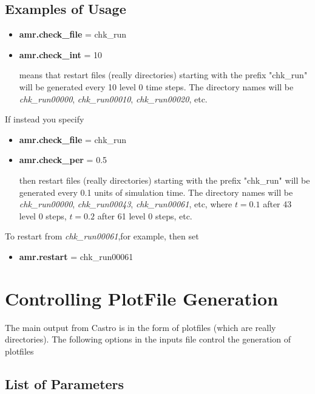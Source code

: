 \subsection{Examples of Usage}

\begin{itemize}

\item {\bf amr.check\_file} = chk\_run
\item {\bf amr.check\_int} = 10

means that restart files (really directories) starting with the prefix "chk\_run" will be
generated every 10 level 0 time steps.  The directory names will be {\it chk\_run00000}, 
{\it chk\_run00010}, {\it chk\_run00020}, etc.

\end{itemize}

If instead you specify

\begin{itemize}

\item {\bf amr.check\_file} = chk\_run
\item {\bf amr.check\_per} = 0.5

then restart files (really directories) starting with the prefix "chk\_run" will be
generated every 0.1 units of simulation time.  The directory names will be {\it chk\_run00000}, 
{\it chk\_run00043}, {\it chk\_run00061}, etc, where $t = 0.1$ after 43 level 0 steps, 
$t = 0.2$ after 61 level 0 steps, etc.

\end{itemize}

To restart from {\it chk\_run00061},for example, then set 

\begin{itemize}
\item {\bf amr.restart} = chk\_run00061
\end{itemize}

\section{Controlling PlotFile Generation}
\label{sec:PlotFiles}
The main output from Castro is in the form of plotfiles (which are really directories).
The following options in the inputs file control the generation of plotfiles 

\subsection{List of Parameters}

